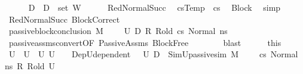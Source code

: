 \begin{isabellebody}
\ \ \ \ \isamarkupfalse%
\ {\isacharquery}{\kern0pt}D{}\ {\isacharequal}{\kern0pt}\ {\isachardoublequoteopen}D{}\ {\isasymunion}\ {\isacharparenleft}{\kern0pt}set\ W{\isacharparenright}{\kern0pt}{\isachardoublequoteclose}\isanewline
\ \ \ \ \isamarkupfalse%
\ RedNormalSucc\ \isamarkupfalse%
\ {\isachardoublequoteopen}csTemp\ {\isacharequal}{\kern0pt}\ cs{\isachardoublequoteclose}\ \isamarkupfalse%
\ Block\ \isamarkupfalse%
\ simp\isanewline
\ \ \ \ \isamarkupfalse%
\ RedNormalSucc\ BlockCorrect\ \ \isamarkupfalse%
\ {\isachardoublequoteopen}passive{\isacharunderscore}{\kern0pt}block{\isacharunderscore}{\kern0pt}conclusion\ M\ {\isasymLambda}{}\ {\isasymLambda}{}\ {\isasymGamma}\ {\isasymOmega}\ U{}\ {\isacharquery}{\kern0pt}D{}\ {\isacharquery}{\kern0pt}R{\isacharprime}{\kern0pt}\ R{\isacharunderscore}{\kern0pt}old\ cs{}\ {\isacharparenleft}{\kern0pt}Normal\ ns{\isacharprime}{\kern0pt}{\isacharparenright}{\kern0pt}{\isachardoublequoteclose}\isanewline
\ \ \ \ \ \ \isamarkupfalse%
\ passive{\isacharunderscore}{\kern0pt}assms{\isacharunderscore}{\kern0pt}convert{\isacharbrackleft}{\kern0pt}OF\ PassiveAssms\ BlockFree{\isacharbrackright}{\kern0pt}\isanewline
\ \ \ \ \ \ \isamarkupfalse%
\ blast\isanewline
\ \ \ \ \isamarkupfalse%
\ this\ \isamarkupfalse%
\ U{}\ \ {\isachardoublequoteopen}U{}\ {\isasymsubseteq}\ U{}{\isachardoublequoteclose}\ U{}\ {\isasymnoteq}\ {\isacharbraceleft}{\kern0pt}{\isacharbraceright}{\kern0pt}{\isachardoublequoteclose}\ \ DepU{}{\isacharcolon}{\kern0pt}{\isachardoublequoteopen}dependent\ {\isasymLambda}{}\ {\isasymOmega}\ U{}\ {\isacharquery}{\kern0pt}D{}{\isachardoublequoteclose}\ \ SimU{}{\isacharcolon}{\kern0pt}{\isachardoublequoteopen}passive{\isacharunderscore}{\kern0pt}sim\ M\ {\isasymLambda}{}\ {\isasymLambda}{}\ {\isasymGamma}\ {\isasymOmega}\ cs{}\ {\isacharparenleft}{\kern0pt}Normal\ ns{\isacharprime}{\kern0pt}{\isacharparenright}{\kern0pt}\ {\isacharquery}{\kern0pt}R{\isacharprime}{\kern0pt}\ R{\isacharunderscore}{\kern0pt}old\ U{}{\isachardoublequoteclose}\isanewline

\end{isabellebody}
